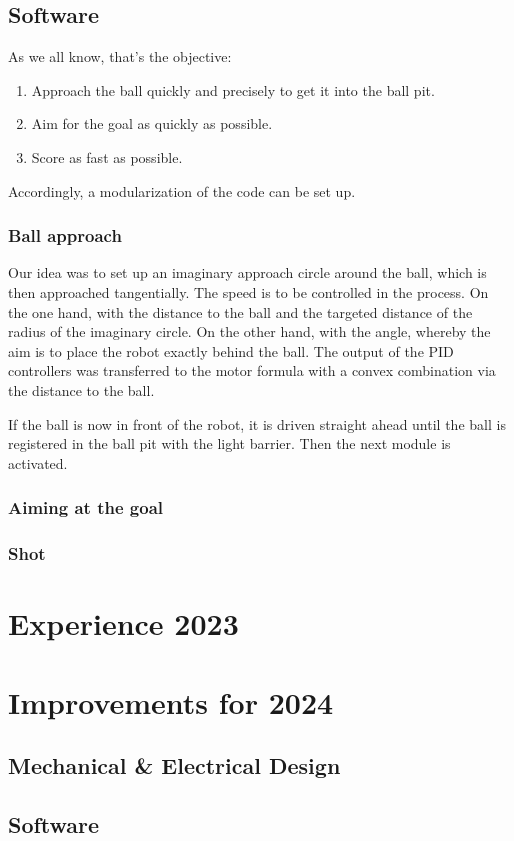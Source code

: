 \documentclass{scrartcl}
\begin{document}
\subsection{Software} %
As we all know, that's the objective:
\begin{enumerate}
    \item{Approach the ball quickly and precisely to get it into the ball pit.}
    \item{Aim for the goal as quickly as possible.}
    \item{Score as fast as possible.}
\end{enumerate}
Accordingly, a modularization of the code can be set up.

\subsubsection{Ball approach}
Our idea was to set up an imaginary approach circle around the ball, which is then approached tangentially. The speed is to be controlled in the process. On the one hand, with the distance to the ball and the targeted distance of the radius of the imaginary circle. On the other hand, with the angle, whereby the aim is to place the robot exactly behind the ball. The output of the PID controllers was transferred to the motor formula with a convex combination via the distance to the ball.

If the ball is now in front of the robot, it is driven straight ahead until the ball is registered in the ball pit with the light barrier. Then the next module is activated.

\subsubsection{Aiming at the goal}

\subsubsection{Shot}

\section{Experience 2023}

\section{Improvements for 2024}

\subsection{Mechanical \& Electrical Design}

\subsection{Software}
\end{document}
